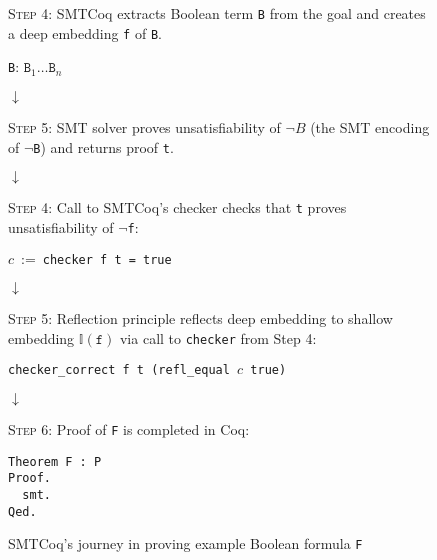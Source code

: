 \documentclass[11pt]{article}
\begin{document}
	\begin{figure}
		\begin{framed}
			\textsc{Step 4}: SMTCoq extracts Boolean 
			term \texttt{B} from the goal and creates a deep 
			embedding \texttt{f} of \texttt{B}.
			\begin{center}
				\texttt{B}: $\texttt{B}_1 \ldots \texttt{B}_n$
			\end{center}
		\end{framed}
		\vspace{-0.3in}
		\begin{center}
			$\downarrow$
		\end{center}
		\vspace{-0.3in}
		\begin{framed}
			\textsc{Step 5}: SMT solver 
			proves unsatisfiability of $\neg B$ 
			(the SMT encoding of $\neg$\texttt{B}) 
			and returns proof \texttt{t}.
		\end{framed}
		\vspace{-0.3in}
		\begin{center}
			$\downarrow$
		\end{center}
		\vspace{-0.3in}
		\begin{framed}
			\textsc{Step 4}: Call to SMTCoq's 
			checker checks that \texttt{t}
			proves unsatisfiability of 
			\texttt{$\neg$f}:
			\begin{center}
				$c\ :=\ $\texttt{checker f t = true}
			\end{center}
		\end{framed}
		\vspace{-0.3in}
		\begin{center}
			$\downarrow$
		\end{center}
		\vspace{-0.3in}
		\begin{framed}
			\textsc{Step 5}: Reflection principle 
			reflects deep embedding to shallow 
			embedding $\mathbb{I}(\texttt{f})$
			via call to \texttt{checker} from 
			Step 4:
			\begin{center}
				\texttt{checker\_correct f t 
					(refl\_equal $c$ true)}
			\end{center}
		\end{framed}
		\vspace{-0.3in}
		\begin{center}
			$\downarrow$
		\end{center}
		\vspace{-0.3in}
		\begin{framed}
			\textsc{Step 6}: Proof of \texttt{F} is 
			completed in Coq:
			\begin{verbatim}
Theorem F : P
Proof.
  smt.
Qed.
			\end{verbatim}
		\end{framed}
		\caption{SMTCoq's journey in proving 
			example Boolean formula \texttt{F}}
		\label{fig:smtcoqex}
	\end{figure}
\end{document}
